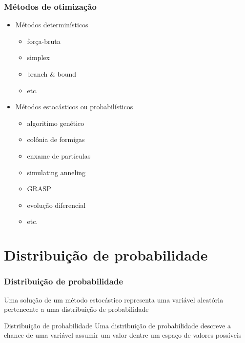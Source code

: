 \documentclass[xcolor=dvipsnames]{beamer}
\begin{document}
\begin{frame}%
\frametitle{Métodos de otimização}

\begin{itemize}
\item Métodos determinísticos

\begin{itemize}
\item força-bruta
\item simplex
\item branch \& bound
\item etc.
\end{itemize}

\vspace{10pt}\item Métodos estocásticos ou probabilísticos

\begin{itemize}
\item algoritimo genético
\item colônia de formigas
\item enxame de partículas
\item simulating anneling
\item GRASP
\item evolução diferencial
\item etc.
\end{itemize}

\end{itemize}

\end{frame}%

\section{Distribuição de probabilidade}

\begin{frame}%
\frametitle{Distribuição de probabilidade}

Uma solução de um método estocástico representa uma variável aleatória pertencente a uma distribuição de probabilidade

\pause
\vspace{30pt}

\begin{block}{Distribuição de probabilidade}
Uma distribuição de probabilidade descreve a chance de uma variável assumir um valor dentre um espaço de valores possíveis
\end{block}	

\end{frame}%
\end{document}
